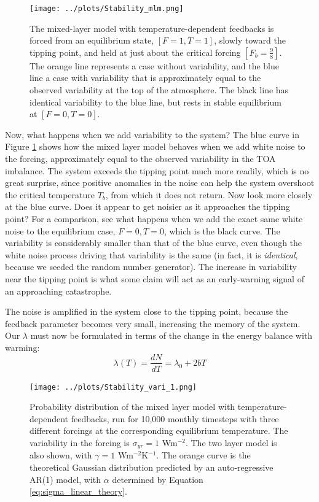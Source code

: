 \documentclass[12pt]{book}
\begin{document}
\begin{figure}
	\begin{center}
		\texttt{[image: ../plots/Stability\_mlm.png]}
	\end{center}
	\caption{The mixed-layer model with temperature-dependent feedbacks is forced from an equilibrium state, $[F=1,T=1]$, slowly toward the tipping point, and held at just about the critical forcing $[F_b=\frac{9}{8}]$. The orange line represents a case without variability, and the blue line a case with variability that is approximately equal to the observed variability at the top of the atmosphere. The black line has identical variability to the blue line, but rests in stable equilibrium at $[F=0,T=0]$.} 
	\label{fig:bifurc_parabolic}
\end{figure}


Now, what happens when we add variability to the system? The blue curve in Figure \ref{fig:bifurc_parabolic} shows how the mixed layer model behaves when we add white noise to the forcing, approximately equal to the  observed variability in the TOA imbalance. The system exceeds the tipping point much more readily, which is no great surprise, since positive anomalies in the noise can help the system overshoot the critical temperature $T_b$, from which it does not return.
Now look more closely at the blue curve. Does it appear to get noisier as it approaches the tipping point? For a comparison, see what happens when we add the exact same white noise to the equilibrium case, $F=0,T=0$, which is the black curve. The variability is considerably smaller than that of the blue curve, even though the white noise process driving that variability is the same (in fact, it is \textit{identical}, because we seeded the random number generator). The increase in variability near the tipping point is what some claim will act as an early-warning signal of an approaching catastrophe.

The noise is amplified in the system close to the tipping point, because the feedback parameter becomes very small, increasing the memory of the system. Our $\lambda$ must now be formulated in terms of the change in the energy balance with warming:
\begin{equation}
	\lambda(T) = \frac{dN}{dT} = \lambda_0 + 2bT
\end{equation}

\begin{figure}
	\begin{center}
		\texttt{[image: ../plots/Stability\_vari\_1.png]}
	\end{center}
	\caption{Probability distribution of the mixed layer model with temperature-dependent feedbacks, run for 10,000 monthly timesteps with three different forcings at the corresponding equilibrium temperature. The variability in the forcing is $\sigma_{yr} = 1$ Wm$^{-2}$. The two layer model is also shown, with $\gamma = 1$ Wm$^{-2}$K$^{-1}$. The orange curve is the theoretical Gaussian distribution predicted by an auto-regressive AR(1) model, with $\alpha$ determined by Equation \ref{eq:sigma_linear_theory}.} 
	\label{fig:variability_shift_parabolic}
\end{figure}
\end{document}
